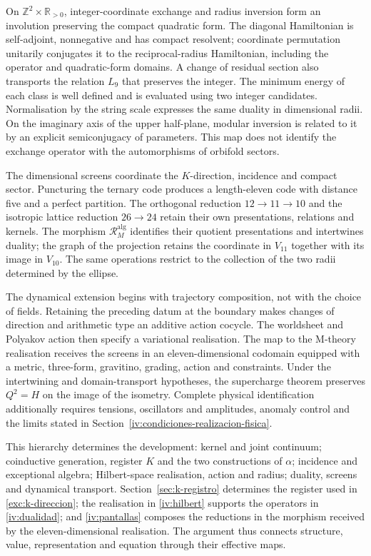 On \(\mathbb Z^2\times\mathbb R_{>0}\), integer-coordinate exchange
and radius inversion form an involution preserving the compact
quadratic form. The diagonal Hamiltonian is self-adjoint, nonnegative
and has compact resolvent; coordinate permutation unitarily conjugates
it to the reciprocal-radius Hamiltonian, including the operator and
quadratic-form domains. A change of residual section also transports
the relation \(L_9\) that preserves the integer. The minimum energy
of each class is well defined and is evaluated using two integer
candidates. Normalisation by the string scale expresses the same
duality in dimensional radii. On the imaginary axis of the upper
half-plane, modular inversion is related to it by an explicit
semiconjugacy of parameters. This map does not identify the exchange
operator with the automorphisms of orbifold sectors.

The dimensional screens coordinate the \(K\)-direction, incidence
and compact sector. Puncturing the ternary code produces a length-eleven
code with distance five and a perfect partition. The orthogonal
reduction \(12\to11\to10\) and the isotropic lattice reduction
\(26\to24\) retain their own presentations, relations and kernels.
The morphism \(\mathcal R_M^{\mathrm{alg}}\) identifies their quotient
presentations and intertwines duality; the graph of the projection
retains the coordinate in \(V_{11}\) together with its image in
\(V_{10}\). The same operations restrict to the collection of the two
radii determined by the ellipse.

The dynamical extension begins with trajectory composition, not with
the choice of fields. Retaining the preceding datum at the boundary
makes changes of direction and arithmetic type an additive action
cocycle. The worldsheet and Polyakov action then specify a variational
realisation. The map to the M-theory realisation receives the screens
in an eleven-dimensional codomain equipped with a metric, three-form,
gravitino, grading, action and constraints. Under the intertwining and
domain-transport hypotheses, the supercharge theorem preserves
\(Q^2=H\) on the image of the isometry. Complete physical identification
additionally requires tensions, oscillators and amplitudes, anomaly
control and the limits stated in
Section~\ref{iv:condiciones-realizacion-fisica}.

This hierarchy determines the development: kernel and joint continuum;
coinductive generation, register \(K\) and the two constructions of
\(\alpha\); incidence and exceptional algebra; Hilbert-space realisation,
action and radius; duality, screens and dynamical transport.
Section~\ref{sec:k-registro} determines the register used in
\ref{exc:k-direccion}; the realisation in \ref{iv:hilbert} supports
the operators in \ref{iv:dualidad}; and \ref{iv:pantallas} composes
the reductions in the morphism received by the eleven-dimensional
realisation. The argument thus connects structure, value, representation
and equation through their effective maps.

\par\endgroup
